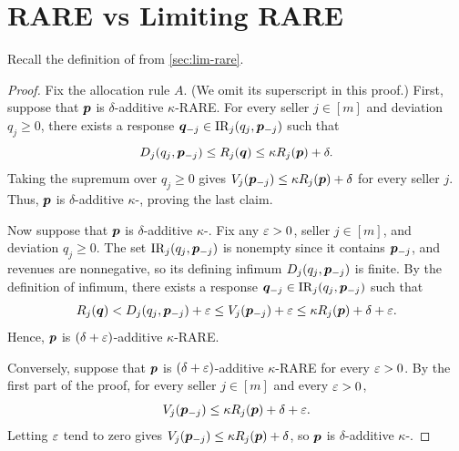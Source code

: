 \section{RARE vs Limiting RARE}
\label{sec:lim-rare-equiv}

Recall the definition of \limRARE{} from \cref{sec:lim-rare}.

\thmRareEquivDefn*
\begin{proof}
Fix the allocation rule $A$.
(We omit its superscript in this proof.)
First, suppose that $\bm{p}$ is $\delta$-additive $\kappa$-RARE.
For every seller $j \in [m]$ and deviation $q_j \ge 0$, there exists a response
$\bm{q}_{-j} \in \operatorname{IR}_j(q_j, \bm{p}_{-j})$ such that
\[ D_j(q_j, \bm{p}_{-j}) \le R_j(\bm{q}) \le \kappa R_j(\bm{p}) + \delta. \]
Taking the supremum over $q_j \ge 0$ gives
$V_j(\bm{p}_{-j}) \le \kappa R_j(\bm{p}) + \delta$ for every seller $j$.
Thus, $\bm{p}$ is $\delta$-additive $\kappa$-\limRARE{}, proving the last claim.

Now suppose that $\bm{p}$ is $\delta$-additive $\kappa$-\limRARE{}.
Fix any $\varepsilon > 0$, seller $j \in [m]$, and deviation $q_j \ge 0$.
The set $\operatorname{IR}_j(q_j, \bm{p}_{-j})$ is nonempty since it contains $\bm{p}_{-j}$,
and revenues are nonnegative, so its defining infimum $D_j(q_j, \bm{p}_{-j})$ is finite.
By the definition of infimum, there exists a response
$\bm{q}_{-j} \in \operatorname{IR}_j(q_j, \bm{p}_{-j})$ such that
\[ R_j(\bm{q}) < D_j(q_j, \bm{p}_{-j}) + \varepsilon
    \le V_j(\bm{p}_{-j}) + \varepsilon
    \le \kappa R_j(\bm{p}) + \delta + \varepsilon. \]
Hence, $\bm{p}$ is $(\delta + \varepsilon)$-additive $\kappa$-RARE.

Conversely, suppose that $\bm{p}$ is $(\delta + \varepsilon)$-additive $\kappa$-RARE
for every $\varepsilon > 0$.
By the first part of the proof, for every seller $j \in [m]$ and every $\varepsilon > 0$,
\[ V_j(\bm{p}_{-j}) \le \kappa R_j(\bm{p}) + \delta + \varepsilon. \]
Letting $\varepsilon$ tend to zero gives $V_j(\bm{p}_{-j}) \le \kappa R_j(\bm{p}) + \delta$,
so $\bm{p}$ is $\delta$-additive $\kappa$-\limRARE{}.
\end{proof}
